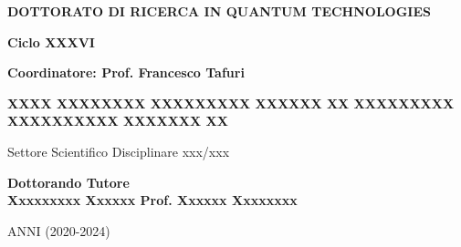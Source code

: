 \documentclass[11pt,oneside]{amsart}
\begin{document}
\begin{titlepage}
\begin{center}
\textbf {\LARGE{D}\large{OTTORATO DI} \LARGE{R}\small{ICERCA IN} \LARGE{Q}\large{UANTUM} \LARGE{T}\large{ECHNOLOGIES}}

\vspace{.5 cm}

{\Large{\bfseries Ciclo XXXVI}}

\vspace{.5 cm}

{\Large{\bfseries Coordinatore: Prof. Francesco Tafuri}}

\vspace{1.5 cm}

{\LARGE{\bfseries{
{XXXX XXXXXXXX XXXXXXXXX XXXXXX XX XXXXXXXXX XXXXXXXXXX XXXXXXX XX}
}}}

\vspace{1.5 cm}

{\large Settore Scientifico Disciplinare xxx/xxx}

\vspace{0.8 cm}

\begin{flushleft}

\hspace{3 cm} \bfseries Dottorando  \hspace{6.5 cm} \bfseries Tutore\\
\vspace{6pt}\hspace{3 cm} Xxxxxxxxx Xxxxxx \hspace{5.45 cm} Prof. Xxxxxx Xxxxxxxx \\
\vspace{6pt}\hspace{11.8 cm}

\end{flushleft}
\vspace{0.8cm}

{\Large A}NNI (2020-2024)
\end{center}
\end{titlepage}
\end{document}
